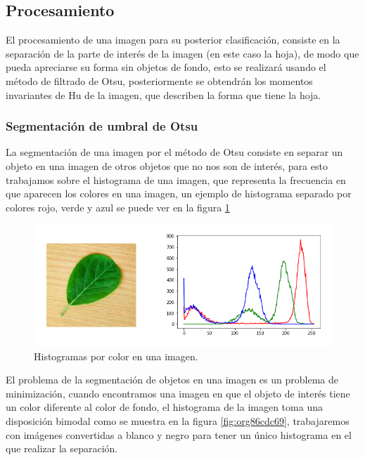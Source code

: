 \documentclass[letter]{article}
\begin{document}
\subsection{Procesamiento}
\label{sec:orgd445cc2}
El procesamiento de una imagen para su posterior clasificación, consiste en la
separación de la parte de interés de la imagen (en este caso la hoja), de modo
que pueda apreciarse su forma sin objetos de fondo, esto se realizará usando el
método de filtrado de Otsu, posteriormente se obtendrán los momentos invariantes
de Hu de la imagen, que describen la forma que tiene la hoja.

\subsubsection{Segmentación de umbral de Otsu}
\label{sec:org7042f5c}
La segmentación de una imagen por el método de Otsu consiste en separar un
objeto en una imagen de otros objetos que no nos son de interés, para esto
trabajamos sobre el histograma de una imagen, que representa la frecuencia en
que aparecen los colores en una imagen, un ejemplo de histograma separado por
colores rojo, verde y azul se puede ver en la figura \ref{fig:org78ea23d}

\begin{figure}[htbp]
\centering
\includegraphics[width=.9\linewidth]{./images/histogram1.png}
\caption{\label{fig:org78ea23d}Histogramas por color en una imagen.}
\end{figure}

El problema de la segmentación de objetos en una imagen es un problema de
minimización, cuando encontramos una imagen en que el objeto de interés tiene un
color diferente al color de fondo, el histograma de la imagen toma una
disposición bimodal como se muestra en la figura \ref{fig:org86cdc69}, trabajaremos con
imágenes convertidas a blanco y negro para tener un único histograma en el que
realizar la separación.
\end{document}
